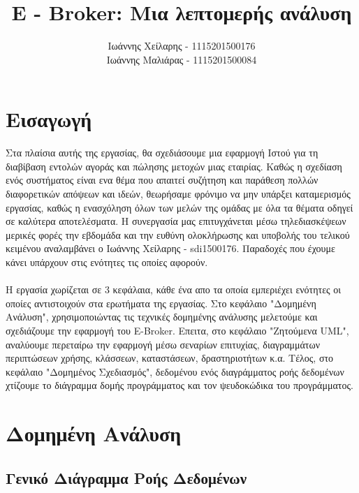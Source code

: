 \documentclass{article}
\begin{document}

\title{E - Broker: Μια λεπτομερής ανάλυση}
\author{
	Ιωάννης Χείλαρης - 1115201500176
	\\
	Ιωάννης Μαλιάρας - 1115201500084
}

\maketitle

\newpage
\tableofcontents


\newpage
\section{Εισαγωγή}
	Στα πλαίσια αυτής της εργασίας, θα σχεδιάσουμε μια εφαρμογή Ιστού για τη διαβίβαση εντολών αγοράς και πώλησης μετοχών μιας εταιρίας.
	Καθώς η σχεδίαση ενός συστήματος είναι ενα θέμα που απαιτεί συζήτηση και παράθεση πολλών διαφορετικών απόψεων και ιδεών, θεωρήσαμε φρόνιμο
	να μην υπάρξει καταμερισμός εργασίας, καθώς η ενασχόληση όλων των μελών της ομάδας με όλα τα θέματα οδηγεί σε καλύτερα αποτελέσματα.
	Η συνεργασία μας επιτυγχάνεται μέσω τηλεδιασκέψεων μερικές φορές την εβδομάδα και την ευθύνη ολοκλήρωσης και υποβολής του τελικού κειμένου
	αναλαμβάνει ο Ιωάννης Χείλαρης - sdi1500176. Παραδοχές που έχουμε κάνει υπάρχουν στις ενότητες τις οποίες αφορούν.
  \\\\
	Η εργασία χωρίζεται σε 3 κεφάλαια, κάθε ένα απο τα οποία εμπεριέχει ενότητες οι οποίες αντιστοιχούν στα ερωτήματα της εργασίας. Στο κεφάλαιο
	"Δομημένη Ανάλυση", χρησιμοποιώντας τις τεχνικές δομημένης ανάλυσης μελετούμε και σχεδιάζουμε την εφαρμογή του E-Broker. Επειτα, στο κεφάλαιο
	"Ζητούμενα UML", αναλύουμε περεταίρω την εφαρμογή μέσω σεναρίων επιτυχίας, διαγραμμάτων περιπτώσεων χρήσης, κλάσσεων, καταστάσεων, δραστηριοτήτων κ.α.
	Τέλος, στο κεφάλαιο "Δομημένος Σχεδιασμός", δεδομένου ενός διαγράμματος ροής δεδομένων χτίζουμε το διάγραμμα δομής προγράμματος και τον ψευδοκώδικα του προγράμματος.
	
  
	
\newpage
\section{Δομημένη Ανάλυση}
	\subsection{Γενικό Διάγραμμα Ροής Δεδομένων}
\end{document}
